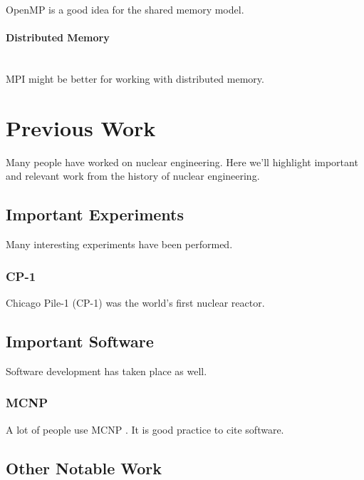 OpenMP is a good idea for the shared memory model.

\paragraph{Distributed Memory}\mbox{} \\

MPI might be better for working with distributed memory.

\section{Previous Work}

Many people have worked on nuclear engineering. Here we'll highlight important and relevant
work from the history of nuclear engineering.

\subsection{Important Experiments}

Many interesting experiments have been performed.

\subsubsection{CP-1}

Chicago Pile-1 (CP-1) was the world's first nuclear reactor.

\subsection{Important Software}

Software development has taken place as well.

\subsubsection{MCNP}

A lot of people use MCNP \cite{mcnp}. It is good practice to cite software.


\subsection{Other Notable Work}



